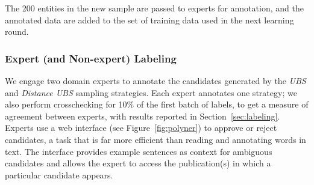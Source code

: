 The 200 entities in the new sample are passed to experts for annotation,
and the annotated data are added to the set of training data used in the next learning round.


\subsubsection{Expert (and Non-expert) Labeling}
We engage two domain experts to annotate the candidates generated by the 
\textit{UBS} and \textit{Distance UBS} sampling strategies. 
Each expert annotates one strategy;
we also perform crosschecking for 10\% of the first batch of labels, to get a measure of agreement between experts,
with results reported in Section~\ref{sec:labeling}. 
Experts use a web interface (see Figure~\ref{fig:polyner}) to approve or reject candidates,
a task that is far more efficient than reading and annotating words in text.
The interface
provides example sentences as context for ambiguous candidates
and allows the expert to access the publication(s) in which a particular candidate
appears. %

